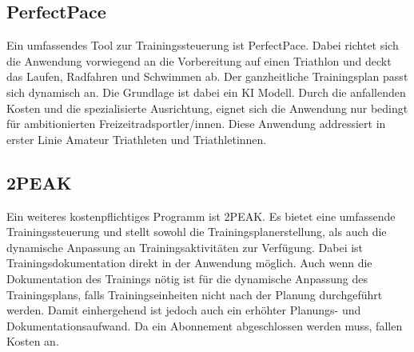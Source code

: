 \subsection{PerfectPace}
Ein umfassendes Tool zur Trainingssteuerung ist PerfectPace.\cite{PerfectPaceWeb} Dabei richtet sich die Anwendung vorwiegend an die Vorbereitung auf einen Triathlon und deckt das Laufen, Radfahren und Schwimmen ab. Der ganzheitliche Trainingsplan passt sich dynamisch an. Die Grundlage ist dabei ein KI Modell. Durch die anfallenden Kosten und die spezialisierte Ausrichtung, eignet sich die Anwendung nur bedingt für ambitionierten Freizeitradsportler/innen. Diese Anwendung addressiert in erster Linie Amateur Triathleten und Triathletinnen.

\subsection{2PEAK}
Ein weiteres kostenpflichtiges Programm ist 2PEAK.\cite{2PeakWeb} Es bietet eine umfassende Trainingssteuerung und stellt sowohl die Trainingsplanerstellung, als auch die dynamische Anpassung an Trainingsaktivitäten zur Verfügung. Dabei ist Trainingsdokumentation direkt in der Anwendung möglich. Auch wenn die Dokumentation des Trainings nötig ist für die dynamische Anpassung des Trainingsplans, falls Trainingseinheiten nicht nach der Planung durchgeführt werden. Damit einhergehend ist jedoch auch ein erhöhter Planungs- und Dokumentationsaufwand. Da ein Abonnement abgeschlossen werden muss, fallen Kosten an.

